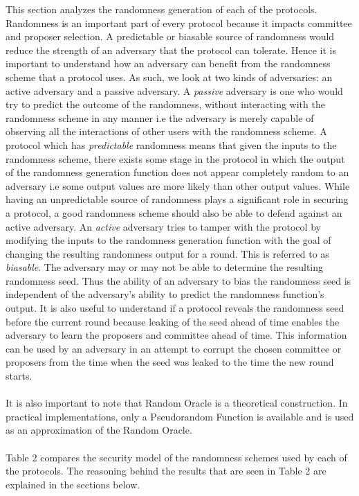 \documentclass[10pt,journal,compsoc]{IEEEtran}
\newcommand\note[1]{\todo[inline]{\textbf{TODO:} #1}}
\begin{document}
\note{CUT Down to be less repetitive.}
This section analyzes the randomness generation of each of the protocols. Randomness is an important part of every protocol because it impacts committee and proposer selection. A predictable or biasable source of randomness would reduce the strength of an adversary that the protocol can tolerate. Hence it is important to understand how an adversary can benefit from the randomness scheme that a protocol uses. As such, we look at two kinds of adversaries: an active adversary and a passive adversary. A \emph{passive} adversary is one who would try to predict the outcome of the randomness, without interacting with the randomness scheme in any manner i.e the adversary is merely capable of observing all the interactions of other users with the randomness scheme. A protocol which has \emph{predictable} randomness means that given the inputs to the randomness scheme, there exists some stage in the protocol in which the output of the randomness generation function does not appear completely random to an adversary i.e some output values are more likely than other output values. While having an unpredictable source of randomness plays a significant role in securing a protocol, a good randomness scheme should also be able to defend against an active adversary. An \emph{active} adversary tries to tamper with the protocol by modifying the inputs to the randomness generation function with the goal of changing the resulting randomness output for a round. This is referred to as \emph{biasable}. The adversary may or may not be able to determine the resulting randomness seed. Thus the ability of an adversary to bias the randomness seed is independent of the adversary's ability to predict the randomness function's output. It is also useful to understand if a protocol reveals the randomness seed before the current round because leaking of the seed ahead of time enables the adversary to learn the proposers and committee ahead of time. This information can be used by an adversary in an attempt to corrupt the chosen committee or proposers from the time when the seed was leaked to the time the new round starts.
\\\\
It is also important to note that Random Oracle is a theoretical construction. In practical implementations, only a Pseudorandom Function is available and is used as an approximation of the Random Oracle. 
\\\\
Table 2 compares the security model of the  randomness schemes used by each of the protocols. The reasoning behind the results that are seen in Table 2 are explained in the sections below.
\end{document}
